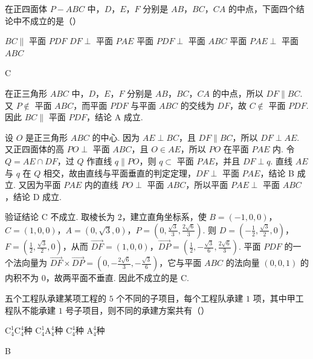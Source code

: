 \begin{problem}
在正四面体 \(P-ABC\) 中，\(D\)，\(E\)，\(F\) 分别是 \(AB\)，\(BC\)，\(CA\) 的中点，下面四个结论中不成立的是（\quad）

\choices
    {\(BC\parallel\) 平面 \(PDF\)}
    {\(DF\perp\) 平面 \(PAE\)}
    {平面 \(PDF\)\(\perp\) 平面 \(ABC\)}
    {平面 \(PAE\)\(\perp\) 平面 \(ABC\)}
\begin{answer}
C
\end{answer}
\end{problem}

\begin{solution}
在正三角形 \(ABC\) 中，\(D\)，\(E\)，\(F\) 分别是 \(AB\)，\(BC\)，\(CA\) 的中点，所以 \(DF\parallel BC\). 又 \(P\notin\) 平面 \(ABC\)，而平面 \(PDF\) 与平面 \(ABC\) 的交线为 \(DF\)，故 \(C\notin\) 平面 \(PDF\). 因此 \(BC\parallel\) 平面 \(PDF\)，结论 A 成立.

设 \(O\) 是正三角形 \(ABC\) 的中心. 因为 \(AE\perp BC\)，且 \(DF\parallel BC\)，所以 \(DF\perp AE\). 又正四面体的高 \(PO\perp\) 平面 \(ABC\)，且 \(O\in AE\)，所以 \(PO\) 在平面 \(PAE\) 内. 令 \(Q=AE\cap DF\)，过 \(Q\) 作直线 \(q\parallel PO\)，则 \(q\subset\) 平面 \(PAE\)，并且 \(DF\perp q\). 直线 \(AE\) 与 \(q\) 在 \(Q\) 相交，故由直线与平面垂直的判定定理，\(DF\perp\) 平面 \(PAE\)，结论 B 成立. 又因为平面 \(PAE\) 内的直线 \(PO\perp\) 平面 \(ABC\)，所以平面 \(PAE\perp\) 平面 \(ABC\)，结论 D 成立.

验证结论 C 不成立. 取棱长为 \(2\)，建立直角坐标系，使 \(B=(-1,0,0)\)，\(C=(1,0,0)\)，\(A=(0,\sqrt3,0)\)，\(P=(0,\frac{\sqrt3}{3},\frac{2\sqrt6}{3})\). 则 \(D=(-\frac12,\frac{\sqrt3}{2},0)\)，\(F=(\frac12,\frac{\sqrt3}{2},0)\)，从而 \(\overrightarrow{DF}=(1,0,0)\)，\(\overrightarrow{DP}=(\frac12,-\frac{\sqrt3}{6},\frac{2\sqrt6}{3})\). 平面 \(PDF\) 的一个法向量为 \(\overrightarrow{DF}\times\overrightarrow{DP}=(0,-\frac{2\sqrt6}{3},-\frac{\sqrt3}{6})\)，它与平面 \(ABC\) 的法向量 \((0,0,1)\) 的内积不为 \(0\)，故两平面不垂直. 因此不成立的是 C.
\end{solution}

\begin{problem}
五个工程队承建某项工程的 \(5\) 个不同的子项目，每个工程队承建 \(1\) 项，其中甲工程队不能承建 \(1\) 号子项目，则不同的承建方案共有（\quad）

\choices
    {\(\mathrm C_4^1\mathrm C_4^4\)种}
    {\(\mathrm C_4^1\mathrm A_4^4\)种}
    {\(\mathrm C_4^4\)种}
    {\(\mathrm A_4^4\)种}
\begin{answer}
B
\end{answer}
\end{problem}

